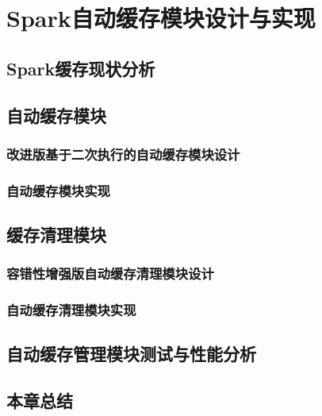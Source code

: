 \chapter{Spark自动缓存模块设计与实现}\label{chap:guide}

\section{Spark缓存现状分析}
\section{自动缓存模块}
\subsection{改进版基于二次执行的自动缓存模块设计}
\subsection{自动缓存模块实现}
\section{缓存清理模块}
\subsection{容错性增强版自动缓存清理模块设计}
\subsection{自动缓存清理模块实现}
\section{自动缓存管理模块测试与性能分析}
\section{本章总结}



